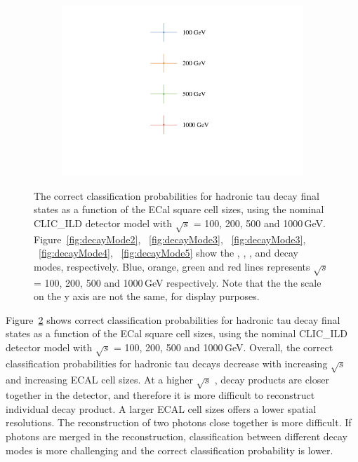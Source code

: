 \documentclass[a4paper,11pt]{article}
\newcommand{\decayPion}{\PGpm\PGnGt}
\newcommand{\decayRho}{\PGrP{\PGpm\PGpz}\PGnGt}
\newcommand{\decayAiPhoton}{\PaDoP{\PGpm\PGpz\PGpz}\PGnGt}
\newcommand{\decayAiPion}{\PaDoP{\PGpm\PGpm\PGpp}\PGnGt}
\newcommand{\decayThreePionPhoton}{\PGpm\PGpm\PGpp\PGpz\PGnGt}
\newcommand{\rootS}{\ensuremath{\sqrt{s}} }
\begin{document}
\begin{figure}[!tbp]
\begin{subfigure}[b]{0.45\textwidth}
  \caption{}
  \label{fig:decayMode6}
\end{subfigure}
\begin{subfigure}[b]{0.45\textwidth}
  \includegraphics[width=\textwidth]{plots3/legend}
\end{subfigure}
\caption{\label{fig:pion_efficiency} The correct classification probabilities for hadronic tau decay final states  as a function of the ECal square cell sizes, using the nominal CLIC\_ILD detector model with \rootS = 100, 200, 500 and 1000\,GeV. Figure~\ref{fig:decayMode2}, ~\ref{fig:decayMode3}, ~\ref{fig:decayMode3}, ~\ref{fig:decayMode4}, ~\ref{fig:decayMode5} show the \decayPion, \decayRho,  \decayAiPhoton, \decayAiPion  and \decayThreePionPhoton  decay modes, respectively. Blue, orange, green and red lines represents  \rootS = 100, 200, 500 and 1000\,GeV respectively. Note that the the scale on the y axis are not the same, for display purposes.}
\end{figure}


Figure~\ref{fig:pion_efficiency} shows correct classification probabilities for hadronic tau decay final states as a function of the ECal square cell sizes, using the nominal CLIC\_ILD detector model with \rootS = 100, 200, 500 and 1000\,GeV. Overall, the correct classification probabilities for hadronic tau decays decrease with increasing \rootS and increasing ECAL cell sizes. At a higher \rootS, decay products are closer together in the detector, and therefore it is more difficult to reconstruct individual decay product. A larger ECAL cell sizes offers a lower spatial resolutions. The reconstruction of two photons close together is more difficult. If photons are merged in the reconstruction, classification between different decay modes is more challenging and the correct classification probability is lower.
\end{document}
